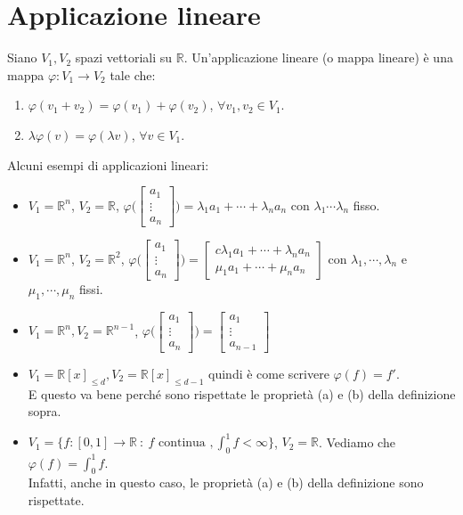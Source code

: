 \newpage
\section{Applicazione lineare}
\begin{definition}
Siano $V_1, V_2$ spazi vettoriali su $\mathbb{R}$. Un'applicazione lineare (o mappa lineare) è una mappa $\varphi: V_1 \to V_2$ tale che:
\begin{enumerate}
    \item $\varphi(v_1 + v_2) = \varphi(v_1) + \varphi(v_2)$, $\forall v_1, v_2 \in V_1$.
    \item $\lambda \varphi(v) = \varphi(\lambda v)$, $\forall  v \in V_1$.
\end{enumerate}
\end{definition}

\begin{example}
Alcuni esempi di applicazioni lineari:
\begin{itemize}
    \item $V_1 = \mathbb{R}^n$, $V_2 = \mathbb{R}$, $\varphi\Big(\begin{bmatrix}a_1\\\vdots\\a_n\end{bmatrix}\Big) = \lambda_1a_1 + \cdots + \lambda_n a_n$ con $\lambda_1 \cdots \lambda_n$ fisso.
    \item $V_1 = \mathbb{R}^n$, $V_2 = \mathbb{R}^2$, $\varphi\Bigg(\begin{bmatrix}a_1 \\ \vdots \\ a_n\end{bmatrix}\Bigg) = \begin{bmatrix}{c}\lambda_1 a_1 + \cdots + \lambda_n a_n \\ \mu_1 a_1 + \cdots + \mu_n a_n\end{bmatrix}$ con $\lambda_1, \cdots, \lambda_n$ e $\mu_1, \cdots, \mu_n$ fissi.
    \item $V_1 = \mathbb{R}^n, V_2 = \mathbb{R}^{n-1}$, $\varphi\Bigg(\begin{bmatrix}a_1 \\ \vdots \\ a_n\end{bmatrix}\Bigg) = \begin{bmatrix}a_1 \\ \vdots \\ a_{n-1}\end{bmatrix}$
    \item $V_1 = \mathbb{R}[x]_{\leq d}, V_2 = \mathbb{R}[x]_{\leq d-1}$ quindi è come scrivere $\varphi(f) = f'$. \\
    E questo va bene perché sono rispettate le proprietà (a) e (b) della definizione sopra.
    \item $V_1 = \{f:[0,1]\to \mathbb{R} \::\: f \text{ continua }, \int_0^1 f<\infty\}$, $V_2 = \mathbb{R}$. Vediamo che $\varphi (f) = \int_0^1 f$.\\
    Infatti, anche in questo caso, le proprietà (a) e (b) della definizione sono rispettate.
\end{itemize}
\end{example}

